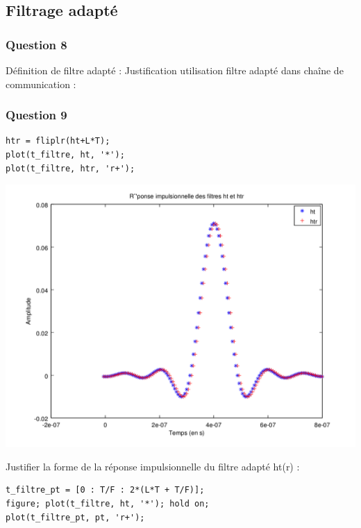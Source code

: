 \documentclass{acm_proc_article-sp}
\begin{document}
\subsection{Filtrage adapté}
\subsubsection{Question 8}
Définition de filtre adapté : 
Justification utilisation filtre adapté dans chaîne de communication :

\subsubsection{Question 9}

\begin{lstlisting}
htr = fliplr(ht+L*T);
plot(t_filtre, ht, '*');
plot(t_filtre, htr, 'r+');
\end{lstlisting}

\begin{center}
\includegraphics[scale=0.45]{ht_htr_9.png}
\end{center}

Justifier la forme de la réponse impulsionnelle du filtre adapté ht(r) :

\begin{lstlisting}
t_filtre_pt = [0 : T/F : 2*(L*T + T/F)];
figure; plot(t_filtre, ht, '*'); hold on;
plot(t_filtre_pt, pt, 'r+');
\end{lstlisting}
\end{document}
